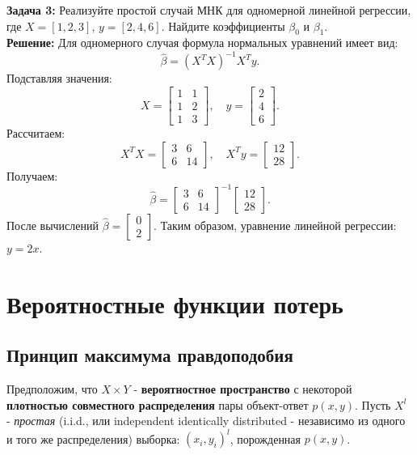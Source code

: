 \textbf{Задача 3:}  
Реализуйте простой случай МНК для одномерной линейной регрессии, где \(X = [1, 2, 3]\), \(y = [2, 4, 6]\). Найдите коэффициенты \(\beta_0\) и \(\beta_1\). \\
\textbf{Решение:}
Для одномерного случая формула нормальных уравнений имеет вид:
\[
\hat{\beta} = (X^T X)^{-1} X^T y.
\]
Подставляя значения:
\[
X = \begin{bmatrix}
1 & 1 \\
1 & 2 \\
1 & 3
\end{bmatrix}, \quad y = \begin{bmatrix} 2 \\ 4 \\ 6 \end{bmatrix}.
\]
Рассчитаем:
\[
X^T X = \begin{bmatrix}
3 & 6 \\
6 & 14
\end{bmatrix}, \quad X^T y = \begin{bmatrix}
12 \\
28
\end{bmatrix}.
\]
Получаем:
\[
\hat{\beta} = \begin{bmatrix}
3 & 6 \\
6 & 14
\end{bmatrix}^{-1} \begin{bmatrix}
12 \\
28
\end{bmatrix}.
\]
После вычислений \(\hat{\beta} = \begin{bmatrix} 0 \\ 2 \end{bmatrix}\). Таким образом, уравнение линейной регрессии: \(y = 2x\).

\newpage

\section{Вероятностные функции потерь}

\subsection{Принцип максимума правдоподобия}

Предположим, что \(X\times Y\) - \textbf{вероятностное пространство} с некоторой \textbf{плотностью совместного распределения} пары объект-ответ \(p(x,y)\). 
Пусть \(X^{l}\) - \textit{простая} (i.i.d., или independent identically distributed - независимо из одного и того же распределения) выборка: \({(x_{i}, y_{i})^{l}}\), порожденная \(p(x,y)\). 

